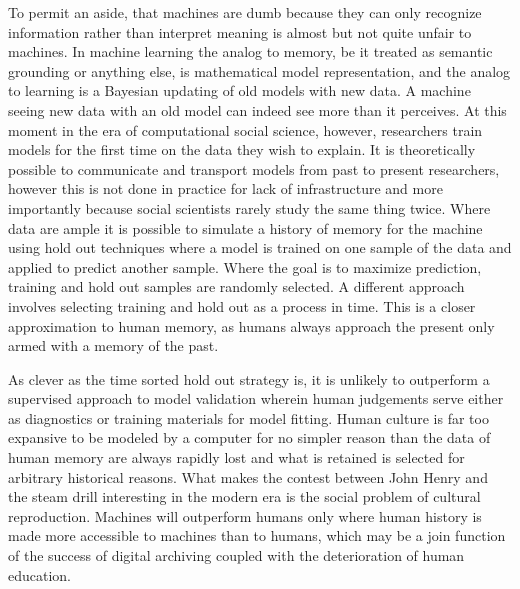 \documentclass[]{book}
\theoremstyle{definition}
\theoremstyle{definition}
\theoremstyle{definition}
\theoremstyle{remark}
\begin{document}
To permit an aside, that machines are dumb because they can only
recognize information rather than interpret meaning is almost but not
quite unfair to machines. In machine learning the analog to memory, be
it treated as semantic grounding or anything else, is mathematical model
representation, and the analog to learning is a Bayesian updating of old
models with new data. A machine seeing new data with an old model can
indeed see more than it perceives. At this moment in the era of
computational social science, however, researchers train models for the
first time on the data they wish to explain. It is theoretically
possible to communicate and transport models from past to present
researchers, however this is not done in practice for lack of
infrastructure and more importantly because social scientists rarely
study the same thing twice. Where data are ample it is possible to
simulate a history of memory for the machine using hold out techniques
where a model is trained on one sample of the data and applied to
predict another sample. Where the goal is to maximize prediction,
training and hold out samples are randomly selected. A different
approach \citep[e.g.~][]{Nay2017Predicting} involves selecting training
and hold out as a process in time. This is a closer approximation to
human memory, as humans always approach the present only armed with a
memory of the past.

As clever as the time sorted hold out strategy is, it is unlikely to
outperform a supervised approach to model validation wherein human
judgements serve either as diagnostics or training materials for model
fitting. Human culture is far too expansive to be modeled by a computer
for no simpler reason than the data of human memory are always rapidly
lost and what is retained is selected for arbitrary historical reasons.
What makes the contest between John Henry and the steam drill
interesting in the modern era is the social problem of cultural
reproduction. Machines will outperform humans only where human history
is made more accessible to machines than to humans, which may be a join
function of the success of digital archiving coupled with the
deterioration of human education.
\end{document}
